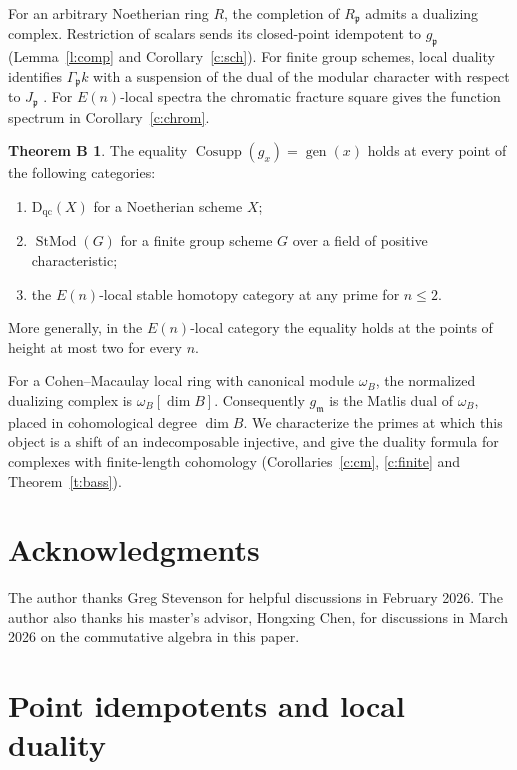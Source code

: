 \documentclass[11pt,reqno]{amsart}
\theoremstyle{definition}
\newtheorem*{mainB}{Theorem B}
\DeclareMathOperator{\Cosupp}{Cosupp}
\DeclareMathOperator{\gen}{gen}
\DeclareMathOperator{\StMod}{StMod}
\newcommand{\D}{\mathrm D}
\newcommand{\p}{\mathfrak p}
\newcommand{\m}{\mathfrak m}
\newcommand{\qc}{\mathrm{qc}}
\numberwithin{equation}{section}
\begin{document}
For an arbitrary Noetherian ring $R$, the completion of $R_{\p}$ admits a dualizing complex. Restriction of scalars sends its closed-point idempotent to $g_{\p}$ (Lemma~\ref{l:comp} and Corollary~\ref{c:sch}). For finite group schemes, local duality identifies $\Gamma_{\p}k$ with a suspension of the dual of the modular character with respect to $J_{\p}$ \cite[Theorem~5.1]{bikp}. For $E(n)$-local spectra the chromatic fracture square gives the function spectrum in Corollary~\ref{c:chrom}.

\begin{mainB}
The equality $\Cosupp(g_x)=\gen(x)$ holds at every point of the following categories:
\begin{enumerate}
\item $\D_{\qc}(X)$ for a Noetherian scheme $X$;
\item $\StMod(G)$ for a finite group scheme $G$ over a field of positive characteristic;
\item the $E(n)$-local stable homotopy category at any prime for $n\le 2$.
\end{enumerate}
More generally, in the $E(n)$-local category the equality holds at the points of height at most two for every $n$.
\end{mainB}

For a Cohen--Macaulay local ring with canonical module $\omega_B$, the normalized dualizing complex is $\omega_B[\dim B]$. Consequently $g_{\m}$ is the Matlis dual of $\omega_B$, placed in cohomological degree $\dim B$. We characterize the primes at which this object is a shift of an indecomposable injective, and give the duality formula for complexes with finite-length cohomology (Corollaries~\ref{c:cm}, \ref{c:finite} and Theorem~\ref{t:bass}). 

\section*{Acknowledgments}
The author thanks Greg Stevenson for helpful discussions in February 2026. The author also thanks his master's advisor, Hongxing Chen, for discussions in March 2026 on the commutative algebra in this paper.

\section{Point idempotents and local duality}
\end{document}
